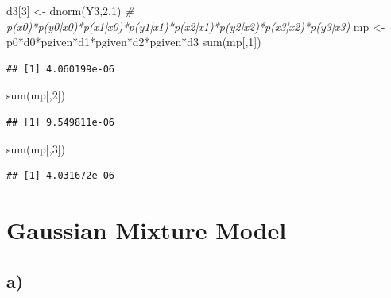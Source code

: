 \documentclass[
]{article}
\newenvironment{Shaded}{\begin{snugshade}}{\end{snugshade}}
\newcommand{\AttributeTok}[1]{\textcolor[rgb]{0.77,0.63,0.00}{#1}}
\newcommand{\CommentTok}[1]{\textcolor[rgb]{0.56,0.35,0.01}{\textit{#1}}}
\newcommand{\DecValTok}[1]{\textcolor[rgb]{0.00,0.00,0.81}{#1}}
\newcommand{\FunctionTok}[1]{\textcolor[rgb]{0.00,0.00,0.00}{#1}}
\newcommand{\NormalTok}[1]{#1}
\newcommand{\OtherTok}[1]{\textcolor[rgb]{0.56,0.35,0.01}{#1}}
\newcommand{\SpecialCharTok}[1]{\textcolor[rgb]{0.00,0.00,0.00}{#1}}
\newcommand{\StringTok}[1]{\textcolor[rgb]{0.31,0.60,0.02}{#1}}
\begin{document}
\begin{Shaded}
\begin{Highlighting}[]
\NormalTok{d3[}\DecValTok{3}\NormalTok{] }\OtherTok{\textless{}{-}} \FunctionTok{dnorm}\NormalTok{(Y3,}\DecValTok{2}\NormalTok{,}\DecValTok{1}\NormalTok{)}
\CommentTok{\# p(x0)*p(y0|x0)*p(x1|x0)*p(y1|x1)*p(x2|x1)*p(y2|x2)*p(x3|x2)*p(y3|x3)}
\NormalTok{mp }\OtherTok{\textless{}{-}}\NormalTok{ p0}\SpecialCharTok{*}\NormalTok{d0}\SpecialCharTok{*}\NormalTok{pgiven}\SpecialCharTok{*}\NormalTok{d1}\SpecialCharTok{*}\NormalTok{pgiven}\SpecialCharTok{*}\NormalTok{d2}\SpecialCharTok{*}\NormalTok{pgiven}\SpecialCharTok{*}\NormalTok{d3}
\FunctionTok{sum}\NormalTok{(mp[,}\DecValTok{1}\NormalTok{])}
\end{Highlighting}
\end{Shaded}

\begin{verbatim}
## [1] 4.060199e-06
\end{verbatim}

\begin{Shaded}
\begin{Highlighting}[]
\FunctionTok{sum}\NormalTok{(mp[,}\DecValTok{2}\NormalTok{])}
\end{Highlighting}
\end{Shaded}

\begin{verbatim}
## [1] 9.549811e-06
\end{verbatim}

\begin{Shaded}
\begin{Highlighting}[]
\FunctionTok{sum}\NormalTok{(mp[,}\DecValTok{3}\NormalTok{])}
\end{Highlighting}
\end{Shaded}

\begin{verbatim}
## [1] 4.031672e-06
\end{verbatim}

\hypertarget{gaussian-mixture-model}{%
\section{Gaussian Mixture Model}\label{gaussian-mixture-model}}

\hypertarget{a-2}{%
\subsection{a)}\label{a-2}}

\begin{Shaded}
\end{Shaded}
\end{document}
